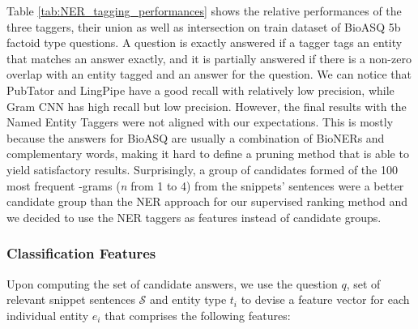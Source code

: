 Table \ref{tab:NER_tagging_performances} shows the relative performances of the three taggers, their union as well as intersection on train dataset of BioASQ 5b factoid type questions. A question is exactly answered if a tagger tags an entity that matches an answer exactly, and it is partially answered if there is a non-zero overlap with an entity tagged and an answer for the question. We can notice that PubTator and LingPipe have a good recall with relatively low precision, while Gram CNN has high recall but low precision. However, the final results with the Named Entity Taggers were not aligned with our expectations. This is mostly because the answers for BioASQ are usually a combination of BioNERs and complementary words, making it hard to define a pruning method that is able to yield satisfactory results. Surprisingly, a group of candidates formed of the 100 most frequent -grams (\textit{n} from 1 to 4) from the snippets' sentences were a better candidate group than the NER approach for our supervised ranking method and we decided to use the NER taggers as features instead of candidate groups.


\subsubsection{Classification Features}\label{sec:classification_features}

Upon computing the set of candidate answers, we use the question $q$, set of relevant snippet sentences $\mathcal{S}$ and entity type $t_i$ to devise a feature vector for each individual entity $e_i$ that comprises the following features:

